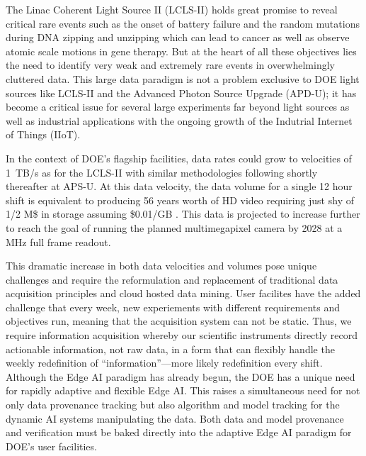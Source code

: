 \documentclass{article}
\begin{document}
The Linac Coherent Light Source II (LCLS-II) holds great promise to reveal critical rare events such as the onset of battery failure and the random mutations during DNA zipping and unzipping which can lead to cancer as well as observe atomic scale motions in gene therapy.
But at the heart of all these objectives lies the need to identify very weak and extremely rare events in overwhelmingly cluttered data. 
This large data paradigm is not a problem exclusive to DOE light sources like LCLS-II and the Advanced Photon Source Upgrade (APD-U); it has become a critical issue for several large experiments far beyond light sources as well as industrial applications with the ongoing growth of the Indutrial Internet of Things (IIoT)\cite{Gartner2018,NetworkWorld2019}.

In the context of DOE's flagship facilities, data rates could grow to velocities of 1~TB/s as for the LCLS-II with similar methodologies following shortly thereafter at APS-U.
At this data velocity, the data volume for a single 12 hour shift is equivalent to producing 56 years worth of HD video \cite{HowBigVideo} requiring just shy of 1/2 M\$ in storage assuming \$0.01/GB \cite{CostPerTB}.
This data is projected to increase further to reach the goal of running the planned multimegapixel camera by 2028 at a MHz full frame readout.

This dramatic increase in both data velocities and volumes pose unique challenges and require the reformulation and replacement of traditional data acquisition principles and cloud hosted data mining. 
User facilites have the added challenge that every week, new experiements with different requirements and objectives run, meaning that the acquisition system can not be static. 
Thus, we require information acquisition whereby our scientific instruments directly record actionable information, not raw data, in a form that can flexibly handle the weekly redefinition of ``information''---more likely redefinition every shift.
Although the Edge AI paradigm has already begun, the DOE has a unique need for rapidly adaptive and flexible Edge AI.
This raises a simultaneous need for not only data provenance tracking but also algorithm and model tracking for the dynamic AI systems manipulating the data.
Both data and model provenance and verification must be baked directly into the adaptive Edge AI paradigm for DOE's user facilities.
\end{document}
